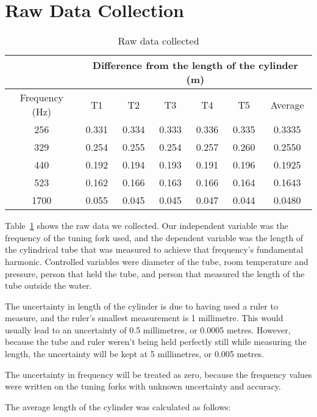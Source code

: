 \documentclass{report}
\begin{document}
\section{Raw Data Collection}

\begin{table}[H]
  \centering
  \begin{tabular}{@{}ccccccc@{}}
    \toprule
    & \multicolumn{6}{c}{Difference from the length of the cylinder
    (m)} \\
    \midrule
    Frequency (Hz) & T1    & T2    & T3    & T4    & T5    & Average \\
    256            & 0.331 & 0.334 & 0.333 & 0.336 & 0.335 & 0.3335  \\
    329            & 0.254 & 0.255 & 0.254 & 0.257 & 0.260 & 0.2550  \\
    440            & 0.192 & 0.194 & 0.193 & 0.191 & 0.196 & 0.1925  \\
    523            & 0.162 & 0.166 & 0.163 & 0.166 & 0.164 & 0.1643  \\
    1700           & 0.055 & 0.045 & 0.045 & 0.047 & 0.044 & 0.0480  \\
    \bottomrule
  \end{tabular}
  \caption{Raw data collected}\label{tab:raw-data}
\end{table}

Table~\ref{tab:raw-data} shows the raw data we collected. Our
independent variable was
the frequency of the tuning fork used, and the dependent variable was
the length of the cylindrical tube that was measured to achieve that
frequency's fundamental harmonic. Controlled variables were diameter
of the tube, room temperature and pressure, person that held the
tube, and person that measured the length of the tube outside the water.

The uncertainty in length of the cylinder is due to having used a
ruler to measure, and the ruler's smallest measurement is 1
millimetre. This would usually lead to an uncertainty of 0.5
millimetres, or 0.0005 metres. However, because the tube and ruler
weren't being held perfectly still while measuring the length, the
uncertainty will be kept at 5 millimetres, or 0.005 metres.

The uncertainty in frequency will be treated as zero, because the
frequency values were written on the tuning forks with unknown
uncertainty and accuracy.

The average length of the cylinder was calculated as follows:
\end{document}
